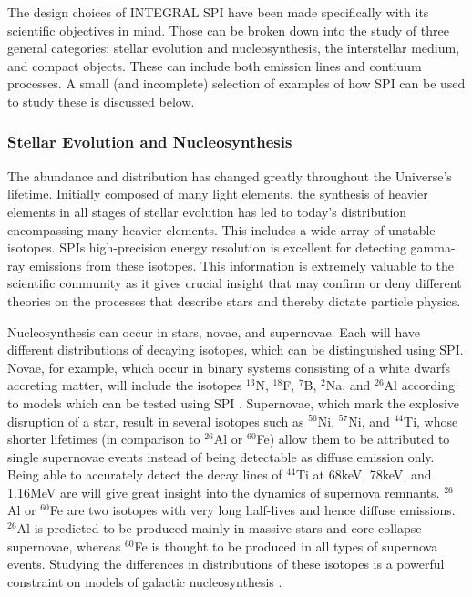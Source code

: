 \documentclass{report}
\begin{document}
The design choices of INTEGRAL SPI have been made specifically with its scientific objectives in mind. Those can be broken down into the study of three general categories: stellar evolution and nucleosynthesis, the interstellar medium, and compact objects. These can include both emission lines and contiuum processes. A small (and incomplete) selection of examples of how SPI can be used to study these is discussed below.

\subsubsection*{Stellar Evolution and Nucleosynthesis}
The abundance and distribution has changed greatly throughout the Universe's lifetime. Initially composed of many light elements, the synthesis of heavier elements in all stages of stellar evolution has led to today's distribution encompassing many heavier elements. This includes a wide array of unstable isotopes. SPIs high-precision energy resolution is excellent for detecting gamma-ray emissions from these isotopes. This information is extremely valuable to the scientific community as it gives crucial insight that may confirm or deny different theories on the processes that describe stars and thereby dictate particle physics.

Nucleosynthesis can occur in stars, novae, and supernovae. Each will have different distributions of decaying isotopes, which can be distinguished using SPI. Novae, for example, which occur in binary systems consisting of a white dwarfs accreting matter, will include the isotopes $^{13}$N, $^{18}$F, $^{7}$B, $^{2}$Na, and $^{26}$Al according to models which can be tested using SPI \cite{Wunderer2002ImagingWT}. Supernovae, which mark the explosive disruption of a star, result in several isotopes such as $^{56}$Ni, $^{57}$Ni, and $^{44}$Ti, whose shorter lifetimes (in comparison to $^{26}$Al or $^{60}$Fe) allow them to be attributed to single supernovae events instead of being detectable as diffuse emission only. Being able to accurately detect the decay lines of $^{44}$Ti at 68keV, 78keV, and 1.16MeV are will give great insight into the dynamics of supernova remnants. $^{26}$Al or $^{60}$Fe are two isotopes with very long half-lives and hence diffuse emissions. $^{26}$Al is predicted to be produced mainly in massive stars and core-collapse supernovae, whereas $^{60}$Fe is thought to be produced in all types of supernova events. Studying the differences in distributions of these isotopes is a powerful constraint on models of galactic nucleosynthesis \cite{Wunderer2002ImagingWT}.
\end{document}

